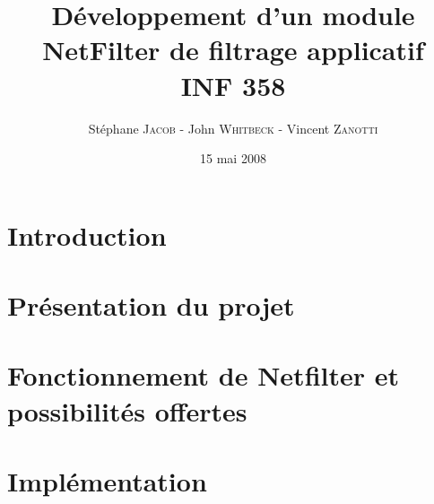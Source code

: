 \documentclass[a4paper,12pt]{article}
\title{Développement d'un module NetFilter de filtrage applicatif\\INF 358}
\author{Stéphane \textsc{Jacob} - John \textsc{Whitbeck} - Vincent \textsc{Zanotti}}
\date{15 mai 2008}
\begin{document}
\maketitle

\section*{Introduction}

\newpage

\section{Présentation du projet}

\newpage

\section{Fonctionnement de Netfilter et possibilités offertes}

\newpage

\section{Implémentation}


%

\nocite{RW}
\nocite{C}
\nocite{S}

\newpage
{}

\end{document}
